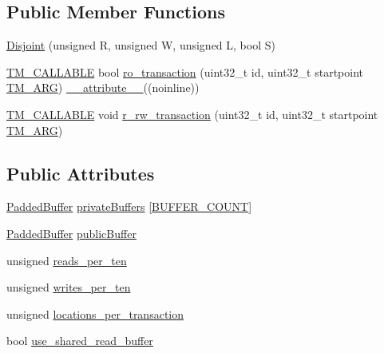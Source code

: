 \subsection*{Public Member Functions}
\begin{DoxyCompactItemize}
\item 
\hyperlink{structDisjoint_a9a1b4c47e0822325d289162f4dd10b9d}{Disjoint} (unsigned R, unsigned W, unsigned L, bool S)
\item 
\hyperlink{tm_8h_adf0341d9b0d169f1aba20257caed702e}{T\-M\-\_\-\-C\-A\-L\-L\-A\-B\-L\-E} bool \hyperlink{structDisjoint_ac740b0c2eb2b55099ce7614a0d69f4ff}{ro\-\_\-transaction} (uint32\-\_\-t id, uint32\-\_\-t startpoint \hyperlink{tm_8h_a030f4350a175fed7a99c242cbaa53258}{T\-M\-\_\-\-A\-R\-G}) \hyperlink{counted__ptr_8hpp_a454a5e4bfc1243a175baaa7327bb751f}{\-\_\-\-\_\-attribute\-\_\-\-\_\-}((noinline))
\item 
\hyperlink{tm_8h_adf0341d9b0d169f1aba20257caed702e}{T\-M\-\_\-\-C\-A\-L\-L\-A\-B\-L\-E} void \hyperlink{structDisjoint_ae4cb8cb741e2927d1d51bcfcbc9ee269}{r\-\_\-rw\-\_\-transaction} (uint32\-\_\-t id, uint32\-\_\-t startpoint \hyperlink{tm_8h_a030f4350a175fed7a99c242cbaa53258}{T\-M\-\_\-\-A\-R\-G})
\end{DoxyCompactItemize}
\subsection*{Public Attributes}
\begin{DoxyCompactItemize}
\item 
\hyperlink{structDisjoint_1_1PaddedBuffer}{Padded\-Buffer} \hyperlink{structDisjoint_ac7ea93b748d1fbfd37086d5060df651b}{private\-Buffers} \mbox{[}\hyperlink{structDisjoint_acfc6dad8c41eb41ba711f907b6be98d3}{B\-U\-F\-F\-E\-R\-\_\-\-C\-O\-U\-N\-T}\mbox{]}
\item 
\hyperlink{structDisjoint_1_1PaddedBuffer}{Padded\-Buffer} \hyperlink{structDisjoint_ae391e9de469259ffa06f1a680fa7ba97}{public\-Buffer}
\item 
unsigned \hyperlink{structDisjoint_a4df2467d5cad8cd5aca6726d1565bd0e}{reads\-\_\-per\-\_\-ten}
\item 
unsigned \hyperlink{structDisjoint_a1c463cc08d167c5706612e8884827d70}{writes\-\_\-per\-\_\-ten}
\item 
unsigned \hyperlink{structDisjoint_aa144f54b8724bb1e00b1715ebce8d7f2}{locations\-\_\-per\-\_\-transaction}
\item 
bool \hyperlink{structDisjoint_ae06e538e8e6d7880a7db67d6d6d610df}{use\-\_\-shared\-\_\-read\-\_\-buffer}
\end{DoxyCompactItemize}
